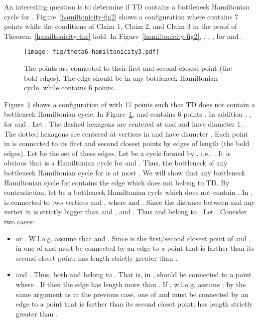 \documentclass[11pt,a4paper]{article}
\newcommand{\kTD}[2]{\text{-}TD#2}
\begin{document}
An interesting question is to determine if \kTD{k}{} contains a bottleneck Hamiltonian cycle for .
Figure~\ref{hamiltonicity-fig2} shows a configuration where  contains 7 points while the conditions of Claim 1, Claim 2, and Claim 3 in the proof of Theorem~\ref{hamiltonicity-thr} hold. In Figure~\ref{hamiltonicity-fig2}, , , ,  for  and .  



\begin{figure}[htb]
  \centering
  \texttt{[image: fig/theta6-hamiltonicity3.pdf]}
 \caption{The points  are connected to their first and second closest point (the bold edges). The edge  should be in any bottleneck Hamiltonian cycle, while  contains 6 points.}
  \label{hamiltonicity-fig3}
\end{figure}

Figure~\ref{hamiltonicity-fig3} shows a configuration of  with 17 points such that \kTD{5}{} does not contain a bottleneck Hamiltonian cycle. In Figure~\ref{hamiltonicity-fig3},  and  contains 6 points . In addition , ,  for  and . Let . The dashed hexagons are centered at  and  and have diameter 1. The dotted hexagons are centered at vertices in  and have diameter . Each point in  is connected to its first and second closest points by edges of length  (the bold edges). Let  be the set of these edges. Let  be a cycle formed by , i.e., . It is obvious that  is a Hamiltonian cycle for  and . Thus, the bottleneck of any bottleneck Hamiltonian cycle for  is at most . We will show that any bottleneck Hamiltonian cycle for  contains the edge  which does not belong to \kTD{5}{}. By contradiction, let  be a bottleneck Hamiltonian cycle which does not contain . In ,  is connected to two vertices  and , where  and . Since the distance between  and any vertex in  is strictly bigger than  and ,  and . Thus  and  belong to . Let . Consider two cases:

\begin{itemize}
 \item  or . W.l.o.g. assume that  and . Since  is the first/second closest point of  and , in  one of  and  must be connected by an edge  to a point that is farther than its second closet point;  has length strictly greater than .
 \item  and . Thus, both  and  belong to . That is, in ,  should be connected to a point  where . If  then the edge  has length more than . If , w.l.o.g. assume ; by the same argument as in the previous case, one of  and  must be connected by an edge  to a point that is farther than its second closet point;  has length strictly greater than .
\end{itemize}
\end{document}
